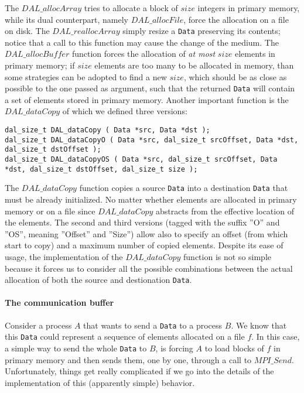 The $DAL\_allocArray$ tries to allocate a block of $size$ integers in primary memory, while its dual counterpart, namely $DAL\_allocFile$, force the allocation on a file on disk. The $DAL\_reallocArray$ simply resize a \texttt{Data} preserving its contents; notice that a call to this function may cause the change of the medium. The $DAL\_allocBuffer$ function forces the allocation of \textit{at most} $size$ elements in primary memory; if $size$ elements are too many to be allocated in memory, than some strategies can be adopted to find a new $size$, which should be as close as possible to the one passed as argument, such that the returned \texttt{Data} will contain a set of elements stored in primary memory.
Another important function is the $DAL\_dataCopy$ of which we defined three versions:
\begin{lstlisting}
dal_size_t DAL_dataCopy ( Data *src, Data *dst ); 
dal_size_t DAL_dataCopyO ( Data *src, dal_size_t srcOffset, Data *dst, dal_size_t dstOffset ); 
dal_size_t DAL_dataCopyOS ( Data *src, dal_size_t srcOffset, Data *dst, dal_size_t dstOffset, dal_size_t size );
\end{lstlisting}
The $DAL\_dataCopy$ function copies a source \texttt{Data} into a destination \texttt{Data} that must be already initialized. No matter whether elements are allocated in primary memory or on a file since $DAL\_dataCopy$ abstracts from the effective location of the elements. The second and third versions (tagged with the suffix ''O'' and ''OS'', meaning ''Offset'' and ''Size'') allow also to specify an offset (from which start to copy) and a maximum number of copied elements. Despite its ease of usage, the implementation of  the $DAL\_dataCopy$ function is not so simple because it forces us to consider all the possible combinations between the actual allocation of both the source and destionation \texttt{Data}. 

\paragraph{The communication buffer}
Consider a process $A$ that wants to send a \texttt{Data} to a process $B$. We know that this \texttt{Data} could represent a sequence of elements allocated on a file $f$. In this case, a simple way to send the whole \texttt{Data} to $B$, is forcing $A$ to load blocks of $f$ in primary memory and then sends them, one by one, through a call to $MPI\_Send$.  Unfortunately, things get really complicated if we go into the details of the implementation of this (apparently simple) behavior. 

